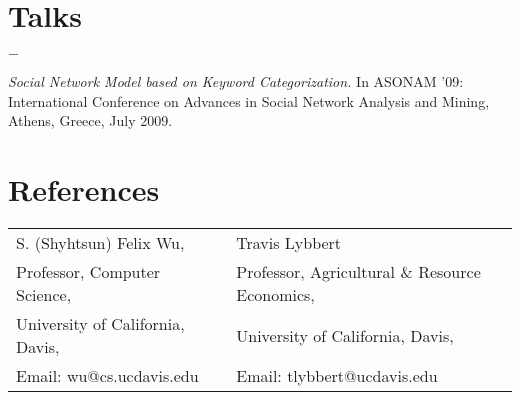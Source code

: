 \documentclass[line]{latex_lib/resume}
\newenvironment{list2}{
  \begin{list}{$-$}{%
      \setlength{\itemsep}{0in}
      \setlength{\parsep}{0in} \setlength{\parskip}{0in}
      \setlength{\topsep}{0in} \setlength{\partopsep}{0in} 
      \setlength{\leftmargin}{0.175in}}}{\end{list}
}
\begin{document}
\begin{resume}
\section{\sc \bf Talks}
\begin{list2}
\item \textit{Social Network Model based on Keyword Categorization.} In ASONAM '09: International Conference on Advances in Social Network Analysis and Mining, Athens, Greece, July 2009.
\end{list2}

\section{\sc \bf References}
\begin{tabular}{lll}
S. (Shyhtsun) Felix Wu,  & & Travis Lybbert \\
Professor, Computer Science, &  & Professor, Agricultural \& Resource Economics, \\
University of California, Davis, &  & University of California, Davis, \\
Email: wu@cs.ucdavis.edu & & Email: tlybbert@ucdavis.edu
\end{tabular}

\end{resume}
\end{document}
